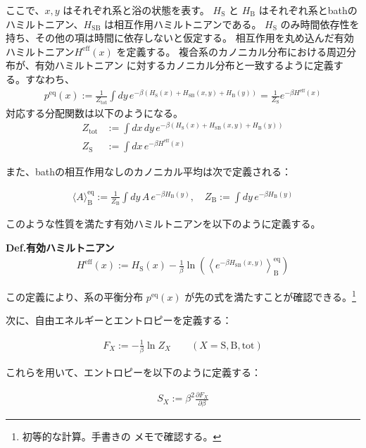 \documentclass[a4paper,11pt]{jsarticle}
\numberwithin{equation}{section}
\begin{document}
ここで、$x, y$ はそれぞれ系と浴の状態を表す。
$H_{\text{S}}$ と $H_{\text{B}}$ はそれぞれ系とbathのハミルトニアン、$H_{\text{SB}}$ は相互作用ハミルトニアンである。
$H_{\text{S}}$ のみ時間依存性を持ち、その他の項は時間に依存しないと仮定する。
相互作用を丸め込んだ有効ハミルトニアン$H^{\mathrm{eff}}(x)$ を定義する。
複合系のカノニカル分布における周辺分布が、有効ハミルトニアン に対するカノニカル分布と一致するように定義する。すなわち、
\begin{align}
p^{\mathrm{eq}}(x)
:= \frac{1}{Z_{\text{tot}}} \int dy\, e^{-\beta(H_{\text{S}}(x) + H_{\text{SB}}(x,y) + H_{\text{B}}(y))}
= \frac{1}{Z_{\text{S}}} e^{-\beta H^{\mathrm{eff}}(x)}
\end{align}
対応する分配関数は以下のようになる。
\begin{align}
Z_{\text{tot}} &:= \int dx\, dy\, e^{-\beta(H_{\text{S}}(x) + H_{\text{SB}}(x,y) + H_{\text{B}}(y))} \\
Z_{\text{S}} &:= \int dx\, e^{-\beta H^{\mathrm{eff}}(x)}
\end{align}

また、bathの相互作用なしのカノニカル平均は次で定義される：

\begin{align}
\langle A \rangle_{\text{B}}^{\mathrm{eq}} := \frac{1}{Z_{\text{B}}} \int dy\, A\, e^{-\beta H_{\text{B}}(y)}, \quad
Z_{\text{B}} := \int dy\, e^{-\beta H_{\text{B}}(y)}
\end{align}

このような性質を満たす有効ハミルトニアンを以下のように定義する。
\begin{itembox}[l]{\textbf{Def.有効ハミルトニアン}}
\begin{align}
H^{\mathrm{eff}}(x) := H_{\text{S}}(x) - \frac{1}{\beta} \ln \left( \left\langle e^{-\beta H_{\text{SB}}(x,y)} \right\rangle_{\text{B}}^{\mathrm{eq}} \right)
\end{align}
\end{itembox}
この定義により、系の平衡分布 $p^{\mathrm{eq}}(x)$ が先の式を満たすことが確認できる。\footnote{初等的な計算。手書きの
メモで確認する。}

次に、自由エネルギーとエントロピーを定義する：

\begin{align}
F_X := - \frac{1}{\beta} \ln Z_X \qquad (X = \text{S}, \text{B}, \text{tot})
\end{align}

これらを用いて、エントロピーを以下のように定義する：

\begin{align}
S_X := \beta^2 \frac{\partial F_X}{\partial \beta}
\end{align}
\end{document}
